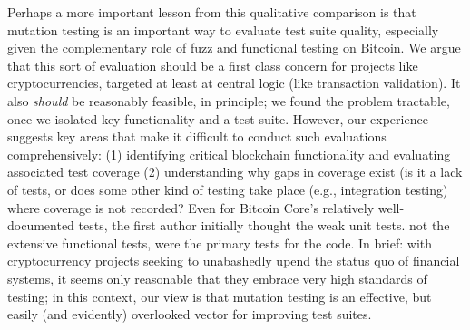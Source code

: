Perhaps a more important lesson from this qualitative comparison is that
mutation testing is an important way to evaluate test suite quality, especially
given the complementary role of fuzz and functional testing on Bitcoin. We argue
that this sort of evaluation should be a first class concern for projects like
cryptocurrencies, targeted at least at central logic (like transaction
validation). It also \emph{should} be reasonably feasible, in principle; we
found the problem tractable, once we isolated key functionality and a test
suite. However, our experience suggests key areas that make it difficult to
conduct such evaluations comprehensively: (1) identifying critical blockchain
functionality and evaluating associated test coverage
(2) understanding why gaps in coverage exist (is it a lack of
tests, or does some other kind of testing take place (e.g., integration testing)
where coverage is not recorded?  Even for Bitcoin Core's relatively
well-documented tests, the first author initially thought the weak unit
tests. not the extensive functional tests, were the primary tests for the code.
In brief: with cryptocurrency projects seeking to unabashedly upend the status quo of financial
systems, it seems only reasonable that they embrace very high standards of testing;
in this context, our
view is that mutation testing is an effective, but easily (and evidently)
overlooked vector for improving test suites.


